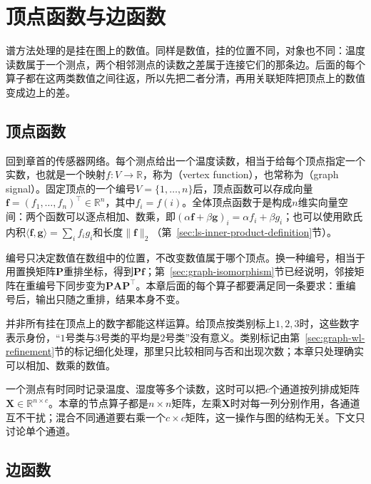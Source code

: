 
\section{顶点函数与边函数}
\label{sec:graph-vertex-edge-functions}

谱方法处理的是挂在图上的数值。同样是数值，挂的位置不同，对象也不同：温度读数属于一个测点，两个相邻测点的读数之差属于连接它们的那条边。后面的每个算子都在这两类数值之间往返，所以先把二者分清，再用关联矩阵把顶点上的数值变成边上的差。

\subsection{顶点函数}
\label{sec:graph-spec-vertex-functions}

回到章首的传感器网络。每个测点给出一个温度读数，相当于给每个顶点指定一个实数，也就是一个映射$f:V\to\mathbb R$，称为（vertex function），也常称为（graph signal）。固定顶点的一个编号$V=\{1,\ldots,n\}$后，顶点函数可以存成向量$\bm f=(f_1,\ldots,f_n)^{\top}\in\mathbb R^n$，其中$f_i=f(i)$。全体顶点函数于是构成$n$维实向量空间：两个函数可以逐点相加、数乘，即$(\alpha\bm f+\beta\bm g)_i=\alpha f_i+\beta g_i$；也可以使用欧氏内积$\langle\bm f,\bm g\rangle=\sum_if_ig_i$和长度$\lVert\bm f\rVert_2$（第~\ref{sec:ls-inner-product-definition}节）。

编号只决定数值在数组中的位置，不改变数值属于哪个顶点。换一种编号，相当于用置换矩阵$\bm P$重排坐标，得到$\bm P\bm f$；第~\ref{sec:graph-isomorphism}节已经说明，邻接矩阵在重编号下同步变为$\bm P\bm A\bm P^{\top}$。本章后面的每个算子都要满足同一条要求：重编号后，输出只随之重排，结果本身不变。

并非所有挂在顶点上的数字都能这样运算。给顶点按类别标上$1,2,3$时，这些数字表示身份，“$1$号类与$3$号类的平均是$2$号类”没有意义。类别标记由第~\ref{sec:graph-wl-refinement}节的标记细化处理，那里只比较相同与否和出现次数；本章只处理确实可以相加、数乘的数值。

一个测点有时同时记录温度、湿度等多个读数，这时可以把$c$个通道按列排成矩阵$\bm X\in\mathbb R^{n\times c}$。本章的节点算子都是$n\times n$矩阵，左乘$\bm X$时对每一列分别作用，各通道互不干扰；混合不同通道要右乘一个$c\times c$矩阵，这一操作与图的结构无关。下文只讨论单个通道。

\subsection{边函数}
\label{sec:graph-spec-edge-functions}

